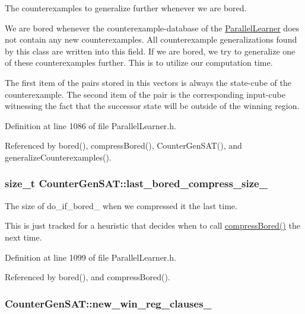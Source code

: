 The counterexamples to generalize further whenever we are bored. 

We are bored whenever the counterexample-\/database of the \hyperlink{classParallelLearner}{Parallel\-Learner} does not contain any new counterexamples. All counterexample generalizations found by this class are written into this field. If we are bored, we try to generalize one of these counterexamples further. This is to utilize our computation time.

The first item of the pairs stored in this vectors is always the state-\/cube of the counterexample. The second item of the pair is the corresponding input-\/cube witnessing the fact that the successor state will be outside of the winning region. 

Definition at line 1086 of file Parallel\-Learner.\-h.



Referenced by bored(), compress\-Bored(), Counter\-Gen\-S\-A\-T(), and generalize\-Counterexamples().

\hypertarget{classCounterGenSAT_ae3befc2cd3c74b65e055f7d29dcc9c05}{
\subsubsection[{last\-\_\-bored\-\_\-compress\-\_\-size\-\_\-}]{\setlength{\rightskip}{0pt plus 5cm}size\-\_\-t Counter\-Gen\-S\-A\-T\-::last\-\_\-bored\-\_\-compress\-\_\-size\-\_\-\hspace{0.3cm}{\ttfamily [protected]}}}\label{classCounterGenSAT_ae3befc2cd3c74b65e055f7d29dcc9c05}


The size of do\-\_\-if\-\_\-bored\-\_\- when we compressed it the last time. 

This is just tracked for a heuristic that decides when to call \hyperlink{classCounterGenSAT_ae696c35988d55e29d5a54b3c71547c12}{compress\-Bored()} the next time. 

Definition at line 1099 of file Parallel\-Learner.\-h.



Referenced by bored(), and compress\-Bored().

\hypertarget{classCounterGenSAT_a5a379bda175a32e3d4ccc0771fde024d}{
\subsubsection[{new\-\_\-win\-\_\-reg\-\_\-clauses\-\_\-}]{ Counter\-Gen\-S\-A\-T\-::new\-\_\-win\-\_\-reg\-\_\-clauses\-\_\-\hspace{0.3cm}{\ttfamily [protected]}}}\label{classCounterGenSAT_a5a379bda175a32e3d4ccc0771fde024d}


